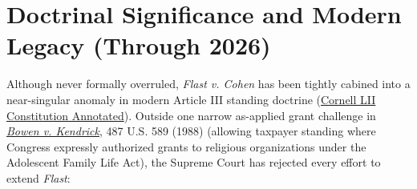 \documentclass[12pt]{article}
\begin{document}
\section{Doctrinal Significance and Modern Legacy (Through 2026)}
Although never formally overruled, \textit{Flast v. Cohen} has been tightly cabined into a near-singular anomaly in modern Article III standing doctrine (\href{https://www.law.cornell.edu/constitution-conan/article-3/section-2/clause-1/taxpayer-standing}{Cornell LII Constitution Annotated}). Outside one narrow as-applied grant challenge in \href{https://supreme.justia.com/cases/federal/us/487/589/}{\textit{Bowen v. Kendrick}}, 487 U.S. 589 (1988) (allowing taxpayer standing where Congress expressly authorized grants to religious organizations under the Adolescent Family Life Act), the Supreme Court has rejected every effort to extend \textit{Flast}:
\end{document}

